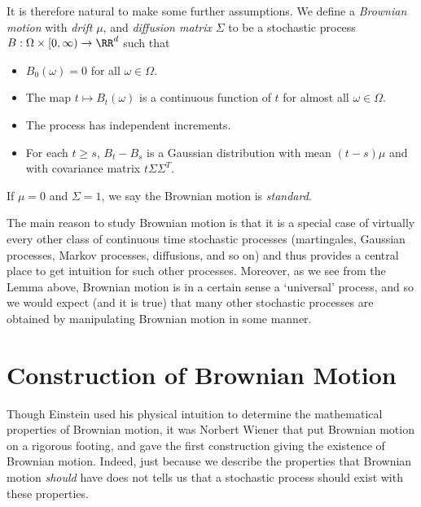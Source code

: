 It is therefore natural to make some further assumptions. We define a \emph{Brownian motion} with \emph{drift} $\mu$, and \emph{diffusion matrix} $\Sigma$ to be a stochastic process $B: \Omega \times [0,\infty) \to \RR^d$ such that
%
\begin{itemize}
    \item $B_0(\omega) = 0$ for all $\omega \in \Omega$.
    \item The map $t \mapsto B_t(\omega)$ is a continuous function of $t$ for almost all $\omega \in \Omega$.
    \item The process has independent increments.
    \item For each $t \geq s$, $B_t - B_s$ is a Gaussian distribution with mean $(t - s) \mu$ and with covariance matrix $t \Sigma \Sigma^T$.
\end{itemize}
%
If $\mu = 0$ and $\Sigma = 1$, we say the Brownian motion is \emph{standard}.

The main reason to study Brownian motion is that it is a special case of virtually every other class of continuous time stochastic processes (martingales, Gaussian processes, Markov processes, diffusions, and so on) and thus provides a central place to get intuition for such other processes. Moreover, as we see from the Lemma above, Brownian motion is in a certain sense a `universal' process, and so we would expect (and it is true) that many other stochastic processes are obtained by manipulating Brownian motion in some manner.

\section{Construction of Brownian Motion}

Though Einstein used his physical intuition to determine the mathematical properties of Brownian motion, it was Norbert Wiener that put Brownian motion on a rigorous footing, and gave the first construction giving the existence of Brownian motion. Indeed, just because we describe the properties that Brownian motion {\it should} have does not tells us that a stochastic process should exist with these properties.

